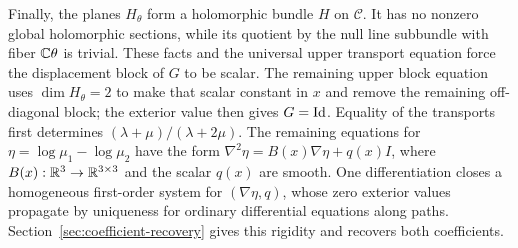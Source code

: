 Finally, the planes $H_\theta$ form a holomorphic bundle $H$ on
$\mathcal C$. It has no nonzero global holomorphic sections, while its
quotient by the null line subbundle with fiber $\mathbb C\theta$ is trivial.
These facts and the universal upper transport equation force the
displacement block of $G$ to be
scalar. The remaining upper block equation uses $\dim H_\theta=2$ to
make that scalar constant in $x$ and remove the remaining off-diagonal
block; the exterior value then gives $G=\mathrm{Id}$.
Equality of the transports first determines
$(\lambda+\mu)/(\lambda+2\mu)$. The remaining equations for
$\eta=\log\mu_1-\log\mu_2$ have the form
$\nabla^2\eta=B(x)\nabla\eta+q(x)I$, where
$B(x):\mathbb R^3\to\mathbb R^{3\times3}$ and the scalar $q(x)$ are smooth.
One differentiation closes a homogeneous first-order system for
$(\nabla\eta,q)$, whose zero exterior values propagate by uniqueness
for ordinary differential equations along paths.
Section~\ref{sec:coefficient-recovery} gives this rigidity and recovers
both coefficients.
